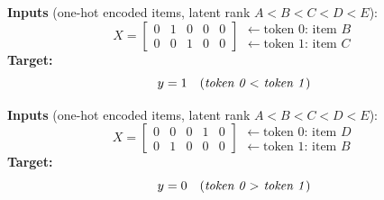 \documentclass[border=4pt]{standalone}
\begin{document}
\begin{tcolorbox}[
    colback=white,
    colframe=black!60,
    width=7.5cm,
    arc=4pt,
    boxrule=0.8pt,
    title={\textbf{Ordinal relations: adjacent pair}},
    fonttitle=\small
]
\small
\textbf{Inputs} (one-hot encoded items, latent rank $A < B < C < D < E$):
\[
X = \begin{bmatrix}
0 & 1 & 0 & 0 & 0 \\
0 & 0 & 1 & 0 & 0
\end{bmatrix}
\begin{array}{l}
\leftarrow \text{token 0: item } B \\
\leftarrow \text{token 1: item } C
\end{array}
\]
\vspace{0.5em}
\textbf{Target:}
\vspace{-1em}
\[
y = 1 \quad \text{(\textit{token 0 $<$ token 1})}
\]
\end{tcolorbox}
\hspace{0.5em}
\begin{tcolorbox}[
    colback=white,
    colframe=black!60,
    width=7.5cm,
    arc=4pt,
    boxrule=0.8pt,
    title={\textbf{Ordinal relations: non-adjacent pair}},
    fonttitle=\small
]
\small
\textbf{Inputs} (one-hot encoded items, latent rank $A < B < C < D < E$):
\[
X = \begin{bmatrix}
0 & 0 & 0 & 1 & 0 \\
0 & 1 & 0 & 0 & 0
\end{bmatrix}
\begin{array}{l}
\leftarrow \text{token 0: item } D \\
\leftarrow \text{token 1: item } B
\end{array}
\]
\vspace{0.5em}
\textbf{Target:}
\vspace{-1em}
\[
y = 0 \quad \text{(\textit{token 0 $>$ token 1})}
\]
\end{tcolorbox}
\end{document}
